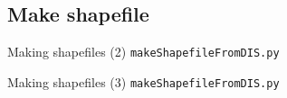 \documentclass[t]{beamer}
\begin{document}
\subsection{Make shapefile}
\begin{frame}{Making shapefiles (2)}
\small{\texttt{makeShapefileFromDIS.py}}
  \begin{figure}[ht]
  \centering
        \lstset{numbers=left}
        
   \end{figure}
\end{frame}

\begin{frame}{Making shapefiles (3)}
\small{\texttt{makeShapefileFromDIS.py}}
  \begin{figure}[ht]
  \centering
        \lstset{numbers=left}
        
   \end{figure}
\end{frame}
\end{document}

